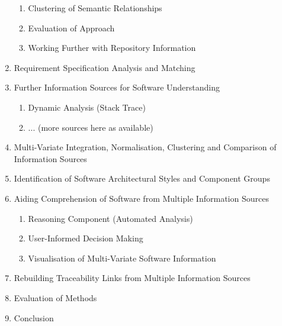 \begin{enumerate}
\begin{enumerate}
\item Clustering of Semantic Relationships
\item Evaluation of Approach
\item Working Further with Repository Information
\end{enumerate}
\item Requirement Specification Analysis and Matching
\item Further Information Sources for Software Understanding
\begin{enumerate}
\item Dynamic Analysis (Stack Trace)
\item ... (more sources here as available)
\end{enumerate}
\item Multi-Variate Integration, Normalisation, Clustering and Comparison of Information Sources
\item Identification of Software Architectural Styles and Component Groups
\item Aiding Comprehension of Software from Multiple Information Sources
\begin{enumerate}
\item Reasoning Component (Automated Analysis)
\item User-Informed Decision Making
\item Visualisation of Multi-Variate Software Information
\end{enumerate}
\item Rebuilding Traceability Links from Multiple Information Sources
\item Evaluation of Methods
\item Conclusion
\end{enumerate}